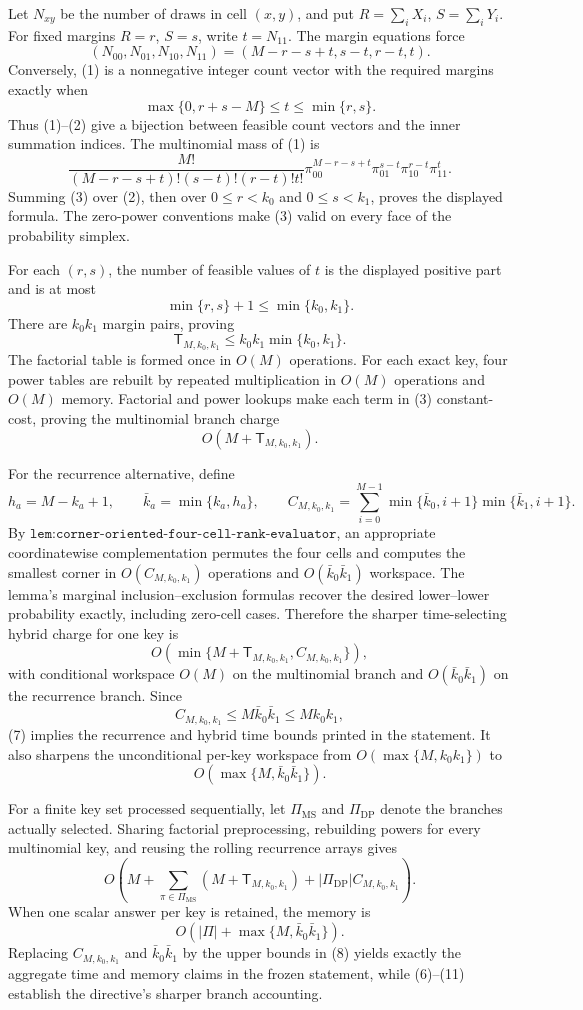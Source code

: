 Let \(N_{xy}\) be the number of draws in cell \((x,y)\), and put \(R=\sum_iX_i\), \(S=\sum_iY_i\). For fixed margins \(R=r\), \(S=s\), write \(t=N_{11}\). The margin equations force
\[
(N_{00},N_{01},N_{10},N_{11})
=(M-r-s+t,s-t,r-t,t). \tag{1}
\]
Conversely, (1) is a nonnegative integer count vector with the required margins exactly when
\[
\max\{0,r+s-M\}\le t\le\min\{r,s\}. \tag{2}
\]
Thus (1)--(2) give a bijection between feasible count vectors and the inner summation indices. The multinomial mass of (1) is
\[
\frac{M!}{(M-r-s+t)!(s-t)!(r-t)!t!}
\pi_{00}^{M-r-s+t}\pi_{01}^{s-t}\pi_{10}^{r-t}\pi_{11}^{t}. \tag{3}
\]
Summing (3) over (2), then over \(0\le r<k_0\) and \(0\le s<k_1\), proves the displayed formula. The zero-power conventions make (3) valid on every face of the probability simplex.

For each \((r,s)\), the number of feasible values of \(t\) is the displayed positive part and is at most
\[
\min\{r,s\}+1\le\min\{k_0,k_1\}.
\]
There are \(k_0k_1\) margin pairs, proving
\[
\mathsf T_{M,k_0,k_1}
\le k_0k_1\min\{k_0,k_1\}. \tag{4}
\]
The factorial table is formed once in \(O(M)\) operations. For each exact key, four power tables are rebuilt by repeated multiplication in \(O(M)\) operations and \(O(M)\) memory. Factorial and power lookups make each term in (3) constant-cost, proving the multinomial branch charge
\[
O(M+\mathsf T_{M,k_0,k_1}). \tag{5}
\]

For the recurrence alternative, define
\[
h_a=M-k_a+1,\qquad
\bar k_a=\min\{k_a,h_a\},\qquad
C_{M,k_0,k_1}=\sum_{i=0}^{M-1}
\min\{\bar k_0,i+1\}\min\{\bar k_1,i+1\}. \tag{6}
\]
By \(\texttt{lem:corner-oriented-four-cell-rank-evaluator}\), an appropriate coordinatewise complementation permutes the four cells and computes the smallest corner in \(O(C_{M,k_0,k_1})\) operations and \(O(\bar k_0\bar k_1)\) workspace. The lemma's marginal inclusion--exclusion formulas recover the desired lower--lower probability exactly, including zero-cell cases. Therefore the sharper time-selecting hybrid charge for one key is
\[
O\!\left(
\min\{M+\mathsf T_{M,k_0,k_1},C_{M,k_0,k_1}\}
\right), \tag{7}
\]
with conditional workspace \(O(M)\) on the multinomial branch and \(O(\bar k_0\bar k_1)\) on the recurrence branch. Since
\[
C_{M,k_0,k_1}
\le M\bar k_0\bar k_1
\le Mk_0k_1, \tag{8}
\]
(7) implies the recurrence and hybrid time bounds printed in the statement. It also sharpens the unconditional per-key workspace from \(O(\max\{M,k_0k_1\})\) to
\[
O(\max\{M,\bar k_0\bar k_1\}). \tag{9}
\]

For a finite key set processed sequentially, let \(\Pi_{\mathrm{MS}}\) and \(\Pi_{\mathrm{DP}}\) denote the branches actually selected. Sharing factorial preprocessing, rebuilding powers for every multinomial key, and reusing the rolling recurrence arrays gives
\[
O\!\left(
M+\sum_{\pi\in\Pi_{\mathrm{MS}}}
(M+\mathsf T_{M,k_0,k_1})
+|\Pi_{\mathrm{DP}}|C_{M,k_0,k_1}
\right). \tag{10}
\]
When one scalar answer per key is retained, the memory is
\[
O\!\left(
|\Pi|+\max\{M,\bar k_0\bar k_1\}
\right). \tag{11}
\]
Replacing \(C_{M,k_0,k_1}\) and \(\bar k_0\bar k_1\) by the upper bounds in (8) yields exactly the aggregate time and memory claims in the frozen statement, while (6)--(11) establish the directive's sharper branch accounting.
